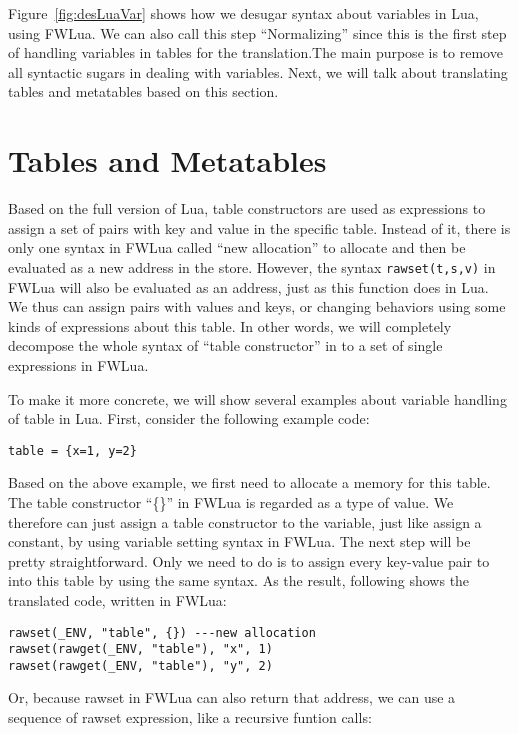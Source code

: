 Figure~\ref{fig:desLuaVar} shows how we desugar syntax about variables in Lua, using FWLua. We can also call this step ``Normalizing'' since this is the first step of handling variables in tables for the translation.The main purpose is to remove all syntactic sugars in dealing with variables. Next, we will talk about translating tables and metatables based on this section.

\section{Tables and Metatables}\label{sec:TranslateTabls}
Based on the full version of Lua, table constructors are used as expressions to assign a set of pairs with key and value in the specific table. Instead of it, there is only one syntax in FWLua called ``new allocation'' to allocate and then be evaluated as a new address in the store. 
However, the syntax {\tt rawset(t,s,v)} in FWLua will also be evaluated as an address, just as this function does in Lua.  We thus can assign pairs with values and keys, or changing behaviors using some kinds of expressions about this table. In other words, we will completely decompose the whole syntax of ``table constructor'' in to a set of single expressions in FWLua. 

To make it more concrete, we will show several examples about variable handling of table in Lua. First, consider the following example code:

\begin{verbatim}
table = {x=1, y=2}
\end{verbatim}

Based on the above example, we first need to allocate a memory for this table. The table constructor ``\{\}'' in FWLua is regarded as a type of value. We therefore can just assign a table constructor to the variable, just like assign a constant, by using variable setting syntax in FWLua. The next step will be pretty straightforward. Only we need to do is to assign every key-value pair to into this table by using the same syntax. As the result, following shows the translated code, written in FWLua:

\begin{verbatim}
rawset(_ENV, "table", {}) ---new allocation
rawset(rawget(_ENV, "table"), "x", 1)
rawset(rawget(_ENV, "table"), "y", 2)
\end{verbatim}

Or, because rawset in FWLua can also return that address, we can use a sequence of rawset expression, like a recursive funtion calls:

